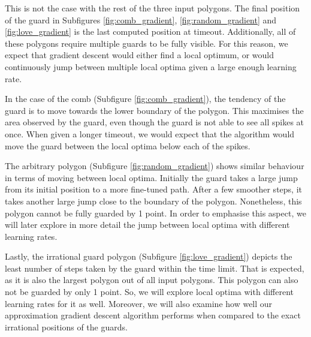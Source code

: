 This is not the case with the rest of the three input polygons. The final position of the guard in Subfigures \ref{fig:comb_gradient}, \ref{fig:random_gradient} and \ref{fig:love_gradient} is the last computed position at timeout. Additionally, all of these polygons require multiple guards to be fully visible. For this reason, we expect that gradient descent would either find a local optimum, or would continuously jump between multiple local optima given a large enough learning rate.

In the case of the comb (Subfigure \ref{fig:comb_gradient}), the tendency of the guard is to move towards the lower boundary of the polygon. This maximises the area observed by the guard, even though the guard is not able to see all spikes at once. When given a longer timeout, we would expect that the algorithm would move the guard between the local optima below each of the spikes.

The arbitrary polygon (Subfigure \ref{fig:random_gradient}) shows similar behaviour in terms of moving between local optima. Initially the guard takes a large jump from its initial position to a more fine-tuned path. After a few smoother steps, it takes another large jump close to the boundary of the polygon. Nonetheless, this polygon cannot be fully guarded by 1 point. In order to emphasise this aspect, we will later explore in more detail the jump between local optima with different learning rates.

Lastly, the irrational guard polygon (Subfigure \ref{fig:love_gradient}) depicts the least number of steps taken by the guard within the time limit. That is expected, as it is also the largest polygon out of all input polygons. This polygon can also not be guarded by only 1 point. So, we will explore local optima with different learning rates for it as well. 
Moreover, we will also examine how well our approximation gradient descent algorithm performs when compared to the exact irrational positions of the guards.


